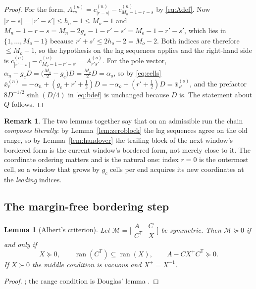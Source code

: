 \documentclass[11pt,a4paper]{article}
\theoremstyle{plain}
\newtheorem{lemma}[theorem]{Lemma}
\theoremstyle{definition}
\newtheorem{remark}[theorem]{Remark}
\newcommand{\T}{\mathsf{T}}
\newcommand{\ran}{\operatorname{ran}}
\newcommand{\PSD}{\succeq 0}
\newcommand{\PD}{\succ 0}
\begin{document}
\begin{proof}
For the form, $A^{(n)}_{rs}=c^{(n)}_{|r-s|}-c^{(n)}_{M_{n}-1-r-s}$ by
\eqref{eq:Adef}. Now $|r-s|=|r'-s'|\le h_{o}-1\le M_{o}-1$ and
$M_{n}-1-r-s=M_{n}-2g_{c}-1-r'-s'=M_{o}-1-r'-s'$, which lies in
$\{1,\dots,M_{o}-1\}$ because $r'+s'\le 2h_{o}-2=M_{o}-2$. Both indices are therefore
$\le M_{o}-1$, so the hypothesis on the lag sequences applies and the right-hand side
is $c^{(o)}_{|r'-s'|}-c^{(o)}_{M_{o}-1-r'-s'}=A^{(o)}_{r's'}$. For the pole vector,
$\alpha_{n}-g_{c}D=\bigl(\tfrac{M_{n}}2-g_{c}\bigr)D=\tfrac{M_{o}}2D=\alpha_{o}$, so
by \eqref{eq:cells}
$\bar x^{(n)}_{r}=-\alpha_{n}+(g_{c}+r'+\tfrac12)D=-\alpha_{o}+(r'+\tfrac12)D
=\bar x^{(o)}_{r'}$, and the prefactor $8D^{-1/2}\sinh(D/4)$ in \eqref{eq:bdef} is
unchanged because $D$ is. The statement about $Q$ follows.
\end{proof}

\begin{remark}
The two lemmas together say that on an admissible run the chain
\emph{composes literally}: by Lemma~\ref{lem:zeroblock} the lag sequences agree on the
old range, so by Lemma~\ref{lem:handover} the trailing block of the next window's
bordered form is the current window's bordered form, not merely close to it. The
coordinate ordering matters and is the natural one: index $r=0$ is the outermost cell,
so a window that grows by $g_{c}$ cells per end acquires its new coordinates at the
\emph{leading} indices.
\end{remark}

\subsection{The margin-free bordering step}

\begin{lemma}[Albert's criterion]
\label{lem:albert}
Let $\mathcal M=\bigl[\begin{smallmatrix}A&C\\ C^{\T}&X\end{smallmatrix}\bigr]$ be
symmetric. Then $\mathcal M\PSD$ if and only if
\begin{equation}
\label{eq:albert}
  X\PSD,\qquad \ran(C^{\T})\subseteq\ran(X),\qquad A-CX^{+}C^{\T}\PSD .
\end{equation}
If $X\PD$ the middle condition is vacuous and $X^{+}=X^{-1}$.
\end{lemma}

\begin{proof}
\cite{Albert1969}; the range condition is Douglas' lemma \cite{Douglas1966}.
\end{proof}
\end{document}
